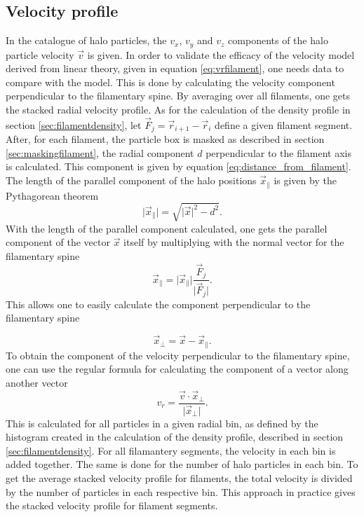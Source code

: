 \subsection{Velocity profile}\label{sec:numfilamentvelocity}
In the catalogue of halo particles, the $v_x$,
$v_y$ and $v_z$ components of the halo particle velocity $\vec{v}$ is given. In order to validate the efficacy of
the velocity model derived from linear theory, given in equation \ref{eq:vrfilament}, one
needs data to compare with the model. This is done by calculating the velocity component perpendicular to the filamentary spine. By averaging over all filaments, one gets the
stacked radial velocity profile. As for the calculation of the density profile in section
\ref{sec:filamentdensity}, let $\vec{F}_j=\vec{r}_{i+1} - \vec{r}_i$ define a given
filament segment. After, for each filament, the particle box is masked as
described in section \ref{sec:maskingfilament}, the radial component $d$
perpendicular to the filament axis is calculated. This component is given by equation \ref{eq:distance_from_filament}. The length of the parallel component of the
halo positions $\vec{x}_\parallel$ is given by the Pythagorean theorem
\begin{equation}
    \vert\vec{x}_\parallel\vert=\sqrt{\vert \vec{x}\vert^2-d^2}.
\end{equation}
With the length of the parallel component calculated, one gets the parallel component of the vector $\vec{x}$ itself
by multiplying with the normal vector for the filamentary spine
\begin{equation}
    \vec{x}_\parallel=\vert\vec{x}_\parallel\vert\frac{\vec{F}_j}{\vert\vec{F}_j\vert}.
\end{equation}
This allows one to easily calculate the component perpendicular to the filamentary spine

\begin{equation}
    \vec{x}_\perp=\vec{x}-\vec{x}_\parallel.
\end{equation}
To obtain the component of the velocity perpendicular to the filamentary spine, one
can use the regular formula for calculating the component of a vector along
another vector
\begin{equation}
    v_r=\frac{\vec{v}\cdot\vec{x}_\perp}{\vert\vec{x}_\perp\vert}.
\end{equation}
This is calculated for all particles in a given radial bin, as defined by the
histogram created in the calculation of the density profile, described in section
\ref{sec:filamentdensity}. For all filamantery segments, the velocity in each bin is added together. The same is done for the number of halo particles in each bin. To get the average stacked velocity profile for filaments, the total velocity is divided by the number of particles in each respective bin. This approach in practice gives the stacked velocity profile for filament segments.
